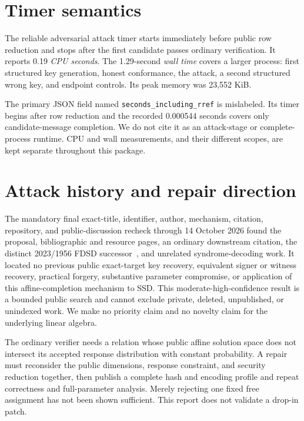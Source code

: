 \documentclass[10pt,a4paper]{article}
\begin{document}
\section{Timer semantics}

The reliable adversarial attack timer starts immediately before public row
reduction and stops after the first candidate passes ordinary verification.
It reports 0.19 \emph{CPU seconds}. The 1.29-second \emph{wall time} covers a
larger process: first structured key generation, honest conformance, the
attack, a second structured wrong key, and endpoint controls. Its peak memory
was 23,552 KiB.

The primary JSON field named \texttt{seconds\_including\_rref} is mislabeled.
Its timer begins after row reduction and the recorded 0.000544 seconds covers
only candidate-message completion. We do not cite it as an attack-stage or
complete-process runtime. CPU and wall measurements, and their different
scopes, are kept separate throughout this package.

\section{Attack history and repair direction}

The mandatory final exact-title, identifier, author, mechanism, citation,
repository, and public-discussion recheck through 14 October 2026 found the
proposal, bibliographic and resource pages, an ordinary downstream citation,
the distinct 2023/1956 FDSD successor~\cite{fdsd}, and unrelated
syndrome-decoding work. It located no previous public exact-target key
recovery, equivalent signer or witness recovery, practical forgery,
substantive parameter compromise, or application of this affine-completion
mechanism to SSD. This moderate-high-confidence result is a bounded public
search and cannot exclude private, deleted, unpublished, or unindexed work.
We make no priority claim and no novelty claim for the underlying linear
algebra.

The ordinary verifier needs a relation whose public affine solution space does
not intersect its accepted response distribution with constant probability.
A repair must reconsider the public dimensions, response constraint, and
security reduction together, then publish a complete hash and encoding
profile and repeat correctness and full-parameter analysis. Merely rejecting
one fixed free assignment has not been shown sufficient. This report does not
validate a drop-in patch.
\end{document}
